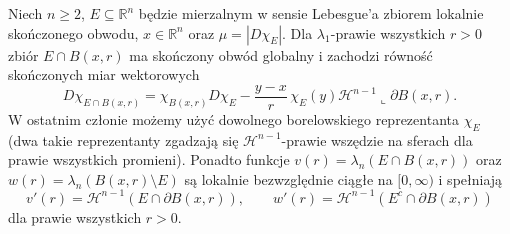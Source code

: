 \begin{lemat}
\label{lem:dg-ball-cut}
Niech $n\ge2$, $E\subseteq\mathbb R^n$ będzie
mierzalnym w sensie Lebesgue'a zbiorem lokalnie
skończonego obwodu, $x\in\mathbb R^n$ oraz
$\mu=|D\chi_E|$. Dla $\lambda_1$-prawie wszystkich
$r>0$ zbiór $E\cap B(x,r)$ ma skończony obwód
globalny i zachodzi równość skończonych miar wektorowych
\[
 D\chi_{E\cap B(x,r)}
 =\chi_{B(x,r)}D\chi_E
 -\frac{y-x}{r}\,\chi_E(y)
 \mathcal H^{n-1}\llcorner\partial B(x,r).
\]
W ostatnim członie możemy użyć dowolnego
borelowskiego reprezentanta $\chi_E$ (dwa takie
reprezentanty zgadzają się $\mathcal H^{n-1}$-prawie
wszędzie na sferach dla prawie wszystkich promieni).
Ponadto funkcje $v(r)=\lambda_n(E\cap B(x,r))$
oraz $w(r)=\lambda_n(B(x,r)\setminus E)$ są
lokalnie bezwzględnie ciągłe na $[0,\infty)$
i spełniają
\[
 v'(r)=\mathcal H^{n-1}(E\cap\partial B(x,r)),\qquad
 w'(r)=\mathcal H^{n-1}(E^c\cap\partial B(x,r))
\]
dla prawie wszystkich $r>0$.
\end{lemat}
